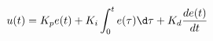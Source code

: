 \documentclass[preview]{standalone}
\begin{document}
\begin{align*}
u(t)=K_pe(t)+K_i\int_0^t e(\tau) \d\tau+K_d\frac{de(t)}{dt}
\end{align*}
\end{document}
